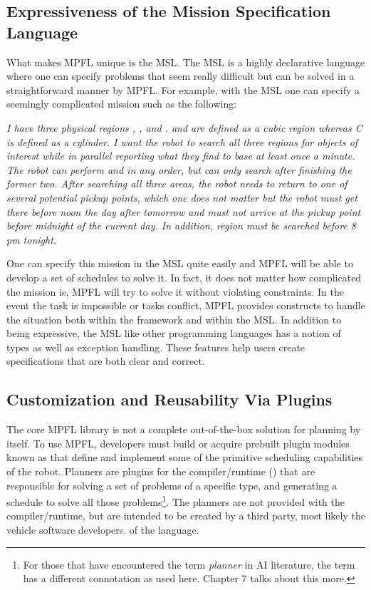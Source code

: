 \subsection{Expressiveness of the Mission Specification Language}
What makes MPFL unique is the MSL. The MSL is a highly declarative language where one can specify problems that seem really difficult but can be solved in a straightforward manner by MPFL. For example, with the MSL one can specify a seemingly complicated mission such as the following:


\begin{flushleft}
\textit{I have three physical regions , , and .  and  are defined as a cubic region whereas C is defined as a cylinder. I want the robot to search all three regions for objects of interest while in parallel reporting what they find to base at least once a minute. The robot can perform  and  in any order, but can only search  after finishing the former two. After searching all three areas, the robot needs to return to one of several potential pickup points, which one does not matter but the robot must get there before noon the day after tomorrow and must not arrive at the pickup point before midnight of the current day. In addition, region  must be searched before 8 pm tonight.}
\end{flushleft}


One can specify this mission in the MSL quite easily and MPFL will be able to develop a set of schedules to solve it. In fact, it does not matter how complicated the mission is, MPFL will try to solve it without violating constraints. In the event the task is impossible or tasks conflict, MPFL provides constructs to handle the situation both within the framework and within the MSL. In addition to being expressive, the MSL like other programming languages has a notion of types as well as exception handling. These features help users create specifications that are both clear and correct.

\subsection{Customization and Reusability Via Plugins}
The core MPFL library is not a complete out-of-the-box solution for planning by itself. To use MPFL, developers must build or acquire prebuilt plugin modules known as  that define and implement some of the primitive scheduling capabilities of the robot. Planners are plugins for the compiler/runtime () that are responsible for solving a set of problems of a specific type, and generating a schedule to solve all those problems\footnote{For those that have encountered the term \textit{planner} in AI literature, the term has a different connotation as used here. Chapter 7 talks about this more.}. The planners are not provided with the compiler/runtime, but are intended to be created by a third party, most likely the vehicle software developers.  of the language.

